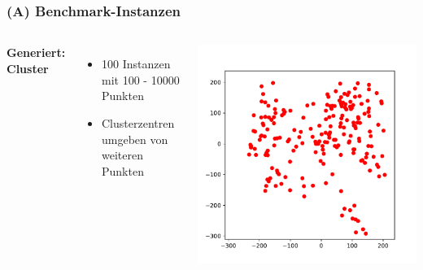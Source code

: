 \documentclass[aspectratio=169]{beamer}
\begin{document}
\begin{frame}
	\frametitle{(A) Benchmark-Instanzen}
	\begin{columns}[c] %
	
	\textbf{Generiert: Cluster}
	\begin{itemize}
		\item 100 Instanzen mit 100 - 10000 Punkten
		\item Clusterzentren umgeben von weiteren Punkten
	\end{itemize}
	
	\includegraphics[scale=.5]{cluster.pdf}
	

	\end{columns}
	\end{frame}

\end{document}
